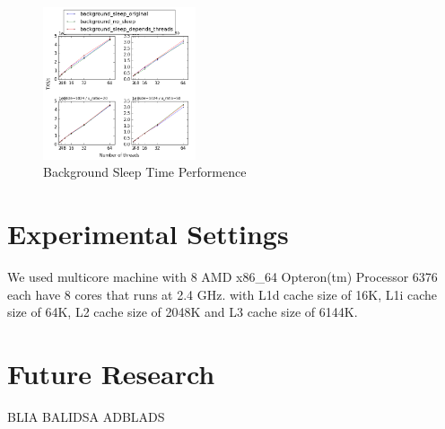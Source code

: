\documentclass{article}
\begin{document}
\begin{figure}
	\caption{Background Sleep Time Performence}
	\centering
	\includegraphics[width=0.4\textwidth]{sleep_plot}
\end{figure}


\section{Experimental Settings}
\label{sec:exp}

We used multicore machine with 8 AMD x86_64 Opteron(tm) Processor 6376 each have 8 cores that runs at 2.4 GHz. with L1d cache size of 16K, L1i cache size of 64K, L2 cache size of 2048K and L3 cache size of 6144K.

\section{Future Research}
\label{sec:foot}

BLIA BALIDSA ADBLADS






\end{document}
